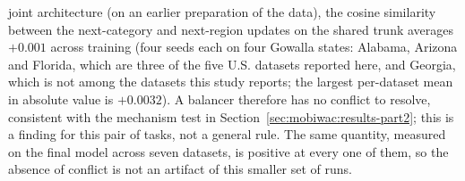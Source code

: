 joint architecture (on an earlier preparation of the data), the cosine
similarity between the next-category and next-region updates on the shared
trunk averages $+0.001$ across training (four seeds each on four Gowalla
states: Alabama, Arizona and Florida, which are three of the five U.S. datasets reported
here, and Georgia, which is not among the datasets this study reports; the largest per-dataset mean in
absolute value is $+0.0032$). A balancer therefore has no
conflict to resolve, consistent with the mechanism test in
Section~\ref{sec:mobiwac:results-part2}; this is a finding for this pair of tasks, not a
general rule. The same quantity, measured on the final model across seven datasets, is
positive at every one of them, so the absence of conflict is not an artifact of this
smaller set of runs.


